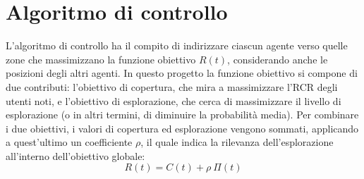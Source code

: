 \section{Algoritmo di controllo} \label{sec:algoritmo_controllo}
L'algoritmo di controllo ha il compito di indirizzare ciascun agente verso quelle zone che massimizzano la funzione obiettivo $R(t)$, considerando anche le posizioni degli altri agenti.
In questo progetto la funzione obiettivo si compone di due contributi: l'obiettivo di copertura, che mira a massimizzare l'RCR degli utenti noti, e l'obiettivo di esplorazione, che cerca di massimizzare il livello di esplorazione (o in altri termini, di diminuire la probabilità media).
Per combinare i due obiettivi, i valori di copertura ed esplorazione vengono sommati, applicando a quest'ultimo un coefficiente $\rho$, il quale indica la rilevanza dell'esplorazione all'interno dell'obiettivo globale:
\begin{equation}
    \label{eq:objective_function}
    R(t) = C(t) + \rho\ \Pi(t)
\end{equation}

